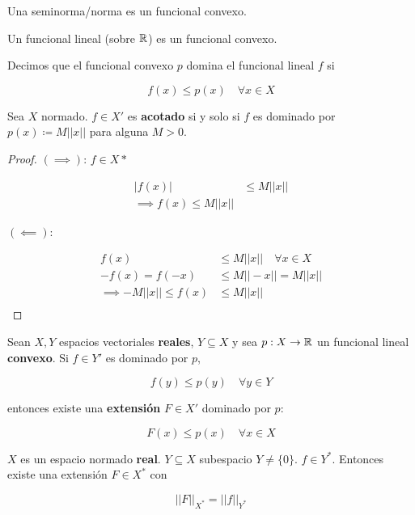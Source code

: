 \begin{fexample}
    Una seminorma/norma es un funcional convexo.
\end{fexample}

\begin{fexample}
    Un funcional lineal (sobre $\mathbb{R}$) es un funcional convexo.
\end{fexample}

\begin{fdefinition}
    Decimos que el funcional convexo $p$ domina el funcional lineal $f$ si 

\[f(x)\leq p(x)\quad\forall x\in X\]
\end{fdefinition}

\begin{fproposition}
    Sea $X$ normado. $f\in X'$ es \textbf{acotado} si y solo si $f$ es dominado por $p(x)\coloneqq M||x||$ para alguna $M>0$.
\end{fproposition}

\begin{proof}
    $(\implies)$: $f\in X*$ 

    \begin{align*}
        |f(x)|&\leq M||x||\\
        \implies f(x)\leq M||x||
    \end{align*}

    $(\impliedby)$: 

    \begin{align*}
        f(x)&\leq M||x||\quad\forall x\in X\\
        -f(x)=f(-x)&\leq M||-x||=M||x||\\
        \implies -M||x||\leq f(x)&\leq M||x||\\
    \end{align*}
\end{proof}

\begin{ftheorem}
    Sean $X,Y$ espacios vectoriales \textbf{reales}, $Y\subseteq X$ y sea $p:X\to\mathbb{R}$ un funcional lineal \textbf{convexo}. Si $f\in Y'$ es dominado por $p$,

    \[f(y)\leq p(y)\quad\forall y\in Y\]

    entonces existe una \textbf{extensión} $F\in X'$ dominado por $p$:

    \[F(x)\leq p(x)\quad\forall x\in X\]
\end{ftheorem}

\begin{fcorollary}
    $X$ es un espacio normado \textbf{real}. $Y\subseteq X$ subespacio $Y\neq \{0\}$. $f\in Y^*$. Entonces existe una extensión $F\in X^*$ con 

    \[||F||_{X^*}=||f||_{Y^*}\]
\end{fcorollary}

